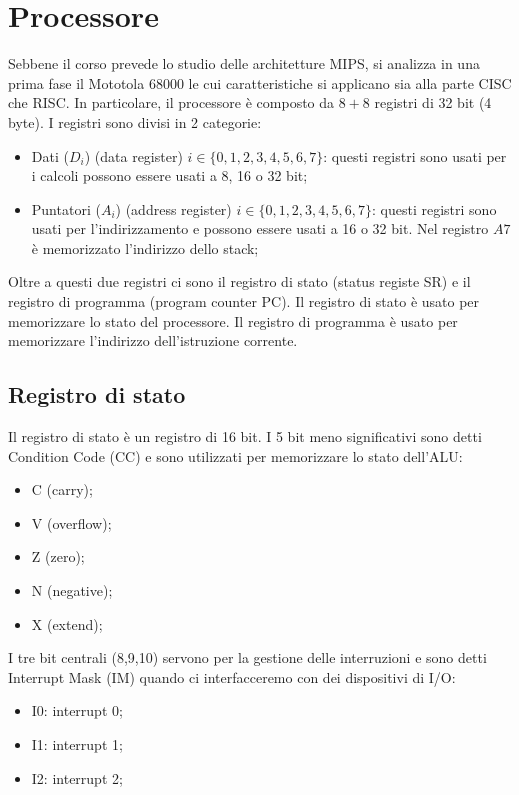 \documentclass{article}
\begin{document}
\section{Processore}
Sebbene il corso prevede lo studio delle architetture MIPS, si 
analizza in una prima fase il Mototola 68000 le cui caratteristiche 
si applicano sia alla parte CISC che RISC. In particolare, il processore
è composto da $8+8$ registri di 32 bit (4 byte). I registri sono divisi in
2 categorie:
\begin{itemize}
  \item Dati ($D_i$) (data register) $i \in \{0,1,2,3,4,5,6,7\}$: questi
    registri sono usati per i calcoli  possono essere usati a 8, 16 o 32 bit;
  \item Puntatori ($A_i$) (address register) $i \in \{0,1,2,3,4,5,6,7\}$: questi
    registri sono usati per l'indirizzamento e possono essere usati a 16 o 32 
    bit. Nel registro $A7$ è memorizzato l'indirizzo dello stack;
\end{itemize}

Oltre a questi due registri ci sono il registro di stato (status registe SR)
e il registro di programma (program counter PC). Il registro di stato è
usato per memorizzare lo stato del processore. Il registro di programma è
usato per memorizzare l'indirizzo dell'istruzione corrente.

\subsection{Registro di stato}
Il registro di stato è un registro di 16 bit. I 5 bit meno significativi sono
detti Condition Code (CC) e sono utilizzati per memorizzare lo stato dell'ALU:
\begin{itemize}
  \item C (carry);
  \item V (overflow);
  \item Z (zero);
  \item N (negative);
  \item X (extend);
\end{itemize}

I tre bit centrali (8,9,10) servono per la gestione delle interruzioni e 
sono detti Interrupt Mask (IM) quando ci interfacceremo con dei dispositivi di
I/O: 
\begin{itemize}
  \item I0: interrupt 0;
  \item I1: interrupt 1;
  \item I2: interrupt 2;
\end{itemize}
\end{document}
